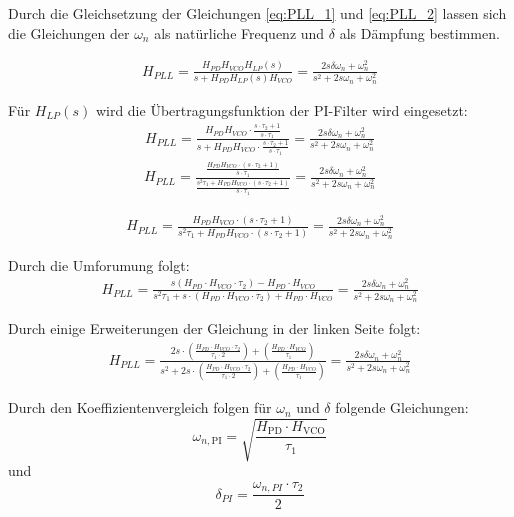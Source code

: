 Durch die Gleichsetzung der Gleichungen \ref{eq:PLL_1} und \ref{eq:PLL_2} lassen sich die Gleichungen der $\omega_n$ als natürliche Frequenz und $\delta$ als Dämpfung bestimmen.

\begin{align}
 H_{PLL} = \frac{H_{PD}H_{VCO}H_{LP}(s)}{s +H_{PD}  H_{LP}(s)H_{VCO}}= \frac{2s\delta\omega_n+\omega^2_n}{s^2+2s\omega_n+\omega^2_n}  
\end{align}

Für $H_{LP}(s)$ wird die Übertragungsfunktion der PI-Filter wird eingesetzt:
\begin{align*}
 H_{PLL} = \frac{H_{PD}H_{VCO}\cdot \frac{s \cdot \tau_2 + 1}{s \cdot \tau_1}}{s +H_{PD} H_{VCO}\cdot \frac{s \cdot \tau_2 + 1}{s \cdot \tau_1}}= \frac{2s\delta\omega_n+\omega^2_n}{s^2+2s\omega_n+\omega^2_n}  
\end{align*}
\begin{align*}
 H_{PLL} = \frac{\frac{H_{PD}H_{VCO}\cdot (s \cdot \tau_2 + 1)}{{s \cdot \tau_1}}}{\frac{s^2\tau_1 +H_{PD} H_{VCO}\cdot (s \cdot \tau_2 + 1)}{{s \cdot \tau_1}}}= \frac{2s\delta\omega_n+\omega^2_n}{s^2+2s\omega_n+\omega^2_n}  
\end{align*}

\begin{align*}
 H_{PLL} = \frac{H_{PD}H_{VCO}\cdot (s \cdot \tau_2 + 1)}{s^2\tau_1 +H_{PD}H_{VCO}\cdot (s \cdot \tau_2 + 1)}= \frac{2s\delta\omega_n+\omega^2_n}{s^2+2s\omega_n+\omega^2_n}  
\end{align*}

Durch die Umforumung folgt:
\begin{align*}
 H_{PLL} = \frac{s( H_{PD}\cdot H_{VCO}\cdot \tau_2)- H_{PD}\cdot H_{VCO}}{s^2\tau_1+s\cdot(H_{PD}\cdot H_{VCO}\cdot \tau_2)+H_{PD}\cdot H_{VCO}}= \frac{2s\delta\omega_n+\omega^2_n}{s^2+2s\omega_n+\omega^2_n}  
\end{align*}

Durch einige Erweiterungen der Gleichung in der linken Seite folgt:
\begin{align*}
 H_{PLL} = \frac{2s\cdot(\frac{H_{PD}\cdot H_{VCO}\cdot \tau_2}{\tau_1 \cdot 2})+(\frac{H_{PD}\cdot H_{VCO}}{\tau_1})}{s^2+2s\cdot(\frac{H_{PD}\cdot H_{VCO}\cdot \tau_2}{\tau_1 \cdot 2})+(\frac{H_{PD}\cdot H_{VCO}}{\tau_1})} = \frac{2s\delta\omega_n+\omega^2_n}{s^2+2s\omega_n+\omega^2_n}  
\end{align*}

Durch den Koeffizientenvergleich folgen für $\omega_n$ und $\delta$ folgende Gleichungen:
\begin{equation}
\label{eq:omega}
\omega_{n,\text{PI}} = \sqrt{\frac{H_{\text{PD}} \cdot H_{\text{VCO}}}{\tau_1}}
\end{equation}
und
\begin{equation}
\label{eq:delta}
\delta_{PI}=\frac{\omega_{n,PI}\cdot \tau_2}{2}
\end{equation}

